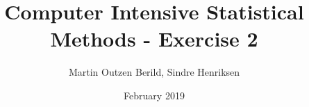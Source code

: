 \documentclass[11pt,a4paper,oneside]{article}
\title{Computer Intensive Statistical Methods - Exercise 2}
\author{Martin Outzen Berild, Sindre Henriksen}
\date{February 2019}
\begin{document}
\maketitle

\section{}
\label{sec:ex1}


\section{}
\label{sec:ex1}


\section{}
\label{sec:ex1}


\section{}
\label{sec:ex1}


\section{}
\label{sec:ex1}


\section{}
\label{sec:ex1}

\end{document}
